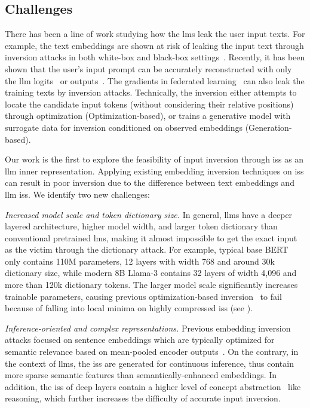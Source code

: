 \documentclass[letterpaper,twocolumn,10pt]{article}
\newcommand{\llama}{Llama}
\theoremstyle{definition}
\begin{document}
\subsection{Challenges}
There has been a line of work studying how the \acp{lm} leak the user input texts.
For example, the text embeddings are shown at risk of leaking the input text through inversion attacks in both white-box and black-box settings~\cite{morris-etal-2023-text,song2020information}.
Recently, it has been shown that the user's input prompt can be accurately reconstructed with only the \ac{llm} logits~\cite{morris2024language} or outputs~\cite{zhang2024extracting}.
The gradients in federated learning~\cite{DBLP:conf/emnlp/DengWLWSLRD21,feng2024uncovering, ccs24unveiling} can also leak the training texts by inversion attacks.
Technically, the inversion either attempts to locate the candidate input tokens (without considering their relative positions) through optimization (Optimization-based), or trains a generative model with surrogate data for inversion conditioned on observed embeddings (Generation-based).





Our work is the first to explore the feasibility of input inversion through \acp{is} as an \ac{llm} inner representation.
Applying existing embedding inversion techniques on \acp{is} can result in poor inversion due to the difference between text embeddings and \ac{llm} \acp{is}.
We identify two new challenges:

\textit{Increased model scale and token dictionary size.}
In general, \acp{llm} have a deeper layered architecture, higher model width, and larger token dictionary than conventional pretrained \acp{lm}, making it almost impossible to get the exact input as the victim through the dictionary attack.
For example, typical base BERT only contains 110M parameters, 12 layers with width 768 and around 30k dictionary size, while modern 8B \llama-3 contains 32 layers of width 4,096 and more than 120k dictionary tokens.
The larger model scale significantly increases trainable parameters, causing previous optimization-based inversion~\cite{song2020information} to fail because of falling into local minima on highly compressed \acp{is} (see ).

\textit{Inference-oriented and complex representations.}
Previous embedding inversion attacks focused on sentence embeddings which are typically optimized for semantic relevance based on mean-pooled encoder outputs~\cite{ni2021large}.
On the contrary, in the context of \acp{llm}, the \acp{is} are generated for continuous inference, thus contain more sparse semantic features than semantically-enhanced embeddings.
In addition, the \acp{is} of deep  layers contain a higher level of concept abstraction~\cite{zou2023representation,concept2025coling} like reasoning, which further increases the difficulty of accurate input inversion.
\end{document}
